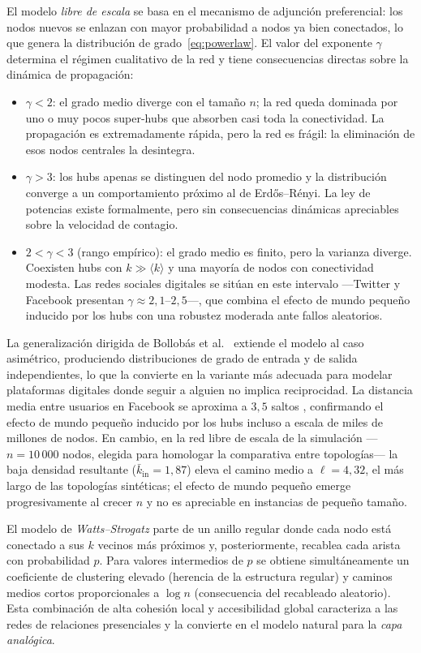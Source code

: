 El modelo \emph{libre de escala} \cite{BarabasiAlbert1999, AlbertBarabasi2002} se basa en el mecanismo de adjunción preferencial: los nodos nuevos se enlazan con mayor probabilidad a nodos ya bien conectados, lo que genera la distribución de grado~\eqref{eq:powerlaw}. El valor del exponente $\gamma$ determina el régimen cualitativo de la red y tiene consecuencias directas sobre la dinámica de propagación:
\begin{itemize}
  \item $\gamma < 2$: el grado medio diverge con el tamaño $n$; la red queda dominada por uno o muy pocos super-hubs que absorben casi toda la conectividad. La propagación es extremadamente rápida, pero la red es frágil: la eliminación de esos nodos centrales la desintegra.
  \item $\gamma > 3$: los hubs apenas se distinguen del nodo promedio y la distribución converge a un comportamiento próximo al de Erdős–Rényi. La ley de potencias existe formalmente, pero sin consecuencias dinámicas apreciables sobre la velocidad de contagio.
  \item $2 < \gamma < 3$ (rango empírico): el grado medio es finito, pero la varianza diverge. Coexisten hubs con $k \gg \langle k \rangle$ y una mayoría de nodos con conectividad modesta. Las redes sociales digitales se sitúan en este intervalo —Twitter y Facebook presentan $\gamma \approx 2{,}1$–$2{,}5$—, que combina el efecto de mundo pequeño inducido por los hubs con una robustez moderada ante fallos aleatorios.
\end{itemize}
La generalización dirigida de Bollobás et al.\ \cite{Bollobas2003} extiende el modelo al caso asimétrico, produciendo distribuciones de grado de entrada y de salida independientes, lo que la convierte en la variante más adecuada para modelar plataformas digitales donde seguir a alguien no implica reciprocidad. La distancia media entre usuarios en Facebook se aproxima a $3{,}5$ saltos \cite{Backstrom2012}, confirmando el efecto de mundo pequeño inducido por los hubs incluso a escala de miles de millones de nodos. En cambio, en la red libre de escala de la simulación ---$n=10\,000$ nodos, elegida para homologar la comparativa entre topologías--- la baja densidad resultante ($\bar{k}_{\mathrm{in}}=1{,}87$) eleva el camino medio a $\ell=4{,}32$, el más largo de las topologías sintéticas; el efecto de mundo pequeño emerge progresivamente al crecer $n$ y no es apreciable en instancias de pequeño tamaño.

El modelo de \emph{Watts–Strogatz} \cite{WattsStrogatz1998} parte de un anillo regular donde cada nodo está conectado a sus $k$ vecinos más próximos y, posteriormente, recablea cada arista con probabilidad $p$. Para valores intermedios de $p$ se obtiene simultáneamente un coeficiente de clustering elevado (herencia de la estructura regular) y caminos medios cortos proporcionales a $\log n$ (consecuencia del recableado aleatorio). Esta combinación de alta cohesión local y accesibilidad global caracteriza a las redes de relaciones presenciales y la convierte en el modelo natural para la \emph{capa analógica}.

